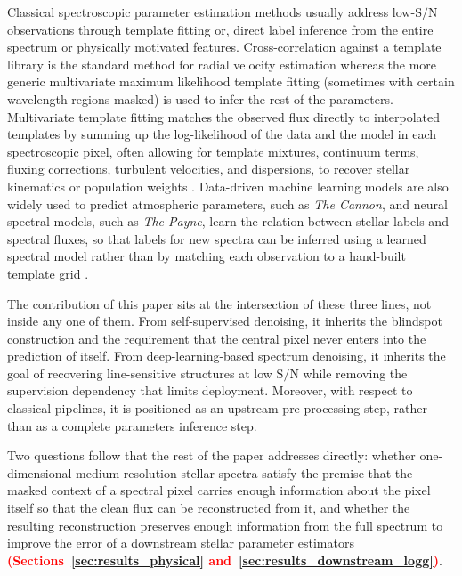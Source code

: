\documentclass[twocolumn]{aastex7}
\newcommand{\ld}[1]{\textcolor{red}{\textbf{#1}}}
\newcommand{\SNR}{\mathrm{S}/\mathrm{N}}
\begin{document}
Classical spectroscopic parameter estimation methods usually address low-$\SNR$ observations through template fitting or, direct label inference from the entire spectrum or physically motivated features. Cross-correlation against a template library is the standard method for radial velocity estimation \citep{Tonry1979_xcorr,Kurtz1998_RVSAO} whereas the more generic multivariate maximum likelihood template fitting (sometimes with certain wavelength regions masked) is used to infer the rest of the parameters. Multivariate template fitting matches the observed flux directly to interpolated templates by summing up the log-likelihood of the data and the model in each spectroscopic pixel, often allowing for template mixtures, continuum terms, fluxing corrections, turbulent velocities, and dispersions, to recover stellar kinematics or population weights \citep{Koleva2009_ULySS,Cappellari2017_pPXFUpdate}. Data-driven machine learning models are also widely used to predict atmospheric parameters, such as \textit{The Cannon}, and neural spectral models, such as \textit{The Payne}, learn the relation between stellar labels and spectral fluxes, so that labels for new spectra can be inferred using a learned spectral model rather than by matching each observation to a hand-built template grid \citep{Ness2015_Cannon,Ting2019_Payne}.

The contribution of this paper sits at the intersection of these three lines, not inside any one of them. From self-supervised denoising, it inherits the blindspot construction and the requirement that the central pixel never enters into the prediction of itself. From deep-learning-based spectrum denoising, it inherits the goal of recovering line-sensitive structures at low $\SNR$ while removing the supervision dependency that limits deployment. Moreover, with respect to classical pipelines, it is positioned as an upstream pre-processing step, rather than as a complete parameters inference step.

Two questions follow that the rest of the paper addresses directly: whether one-dimensional medium-resolution stellar spectra satisfy the premise that the masked context of a spectral pixel carries enough information about the pixel itself so that the clean flux can be reconstructed from it, and whether the resulting reconstruction preserves enough information from the full spectrum to improve the error of a downstream stellar parameter estimators \ld{(Sections~\ref{sec:results_physical} and~\ref{sec:results_downstream_logg})}.
\end{document}
